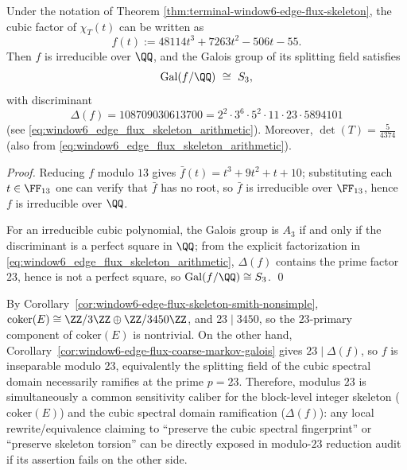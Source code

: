 \begin{corollary}[Algebraic Number-Theoretic Fingerprint of the Four-State Coarse-Grained Kernel: \texorpdfstring{$\mathrm{Gal}\cong S_3$}{Gal=S3} with Discriminant Containing \texorpdfstring{$23$}{23}]\label{cor:window6-edge-flux-coarse-markov-galois}
Under the notation of Theorem \ref{thm:terminal-window6-edge-flux-skeleton},
the cubic factor of \(\chi_T(t)\) can be written as
\[
f(t):=48114t^3+7263t^2-506t-55.
\]
Then \(f\) is irreducible over \(\QQ\), and the Galois group of its splitting field satisfies
\[
\mathrm{Gal}(f/\QQ)\ \cong\ S_3,
\]
with discriminant
\[
\Delta(f)=108709030613700
=2^2\cdot 3^6\cdot 5^2\cdot 11\cdot 23\cdot 5894101
\]
(see \eqref{eq:window6_edge_flux_skeleton_arithmetic}).
Moreover,
\(\det(T)=\frac{5}{4374}\) (also from \eqref{eq:window6_edge_flux_skeleton_arithmetic}).
\end{corollary}
\begin{proof}
Reducing \(f\) modulo \(13\) gives
\(
\bar f(t)=t^3+9t^2+t+10
\);
substituting each \(t\in\FF_{13}\) one can verify that \(\bar f\) has no root, so \(\bar f\) is irreducible over \(\FF_{13}\), hence \(f\) is irreducible over \(\QQ\).
\par
For an irreducible cubic polynomial, the Galois group is \(A_3\) if and only if the discriminant is a perfect square in \(\QQ\);
from the explicit factorization in \eqref{eq:window6_edge_flux_skeleton_arithmetic}, \(\Delta(f)\) contains the prime factor \(23\), hence is not a perfect square, so \(\mathrm{Gal}(f/\QQ)\cong S_3\). \qed
\end{proof}

\begin{remark}\label{rem:window6-common-singular-prime-23}
By Corollary~\ref{cor:window6-edge-flux-skeleton-smith-nonsimple},
\(\mathrm{coker}(E)\cong \ZZ/3\ZZ\oplus \ZZ/3450\ZZ\), and \(23\mid 3450\), so the \(23\)-primary component of \(\mathrm{coker}(E)\) is nontrivial.
On the other hand, Corollary~\ref{cor:window6-edge-flux-coarse-markov-galois} gives \(23\mid \Delta(f)\), so \(f\) is inseparable modulo \(23\), equivalently the splitting field of the cubic spectral domain necessarily ramifies at the prime \(p=23\).
Therefore, modulus \(23\) is simultaneously a common sensitivity caliber for the block-level integer skeleton (\(\mathrm{coker}(E)\)) and the cubic spectral domain ramification (\(\Delta(f)\)): any local rewrite/equivalence claiming to ``preserve the cubic spectral fingerprint'' or ``preserve skeleton torsion'' can be directly exposed in modulo-\(23\) reduction audit if its assertion fails on the other side.
\end{remark}

